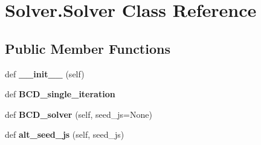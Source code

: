 \hypertarget{classSolver_1_1Solver}{}\section{Solver.\+Solver Class Reference}
\label{classSolver_1_1Solver}
\subsection*{Public Member Functions}
\begin{DoxyCompactItemize}
\item 
\mbox{\label{classSolver_1_1Solver_abdda41490daba1095377220513049b06}} 
def {\bfseries \+\_\+\+\_\+init\+\_\+\+\_\+} (self)
\item 
\mbox{\label{classSolver_1_1Solver_af63c073ee18b64edc40312f833064214}} 
def {\bfseries B\+C\+D\+\_\+single\+\_\+iteration}
\item 
\mbox{\label{classSolver_1_1Solver_adfcca90fd3bc08796692683d717e70a6}} 
def {\bfseries B\+C\+D\+\_\+solver} (self, seed\+\_\+js=None)
\item 
\mbox{\label{classSolver_1_1Solver_aef10191b66f99bdc763b9c9a1dc6d34e}} 
def {\bfseries alt\+\_\+seed\+\_\+js} (self, seed\+\_\+js)
\end{DoxyCompactItemize}
